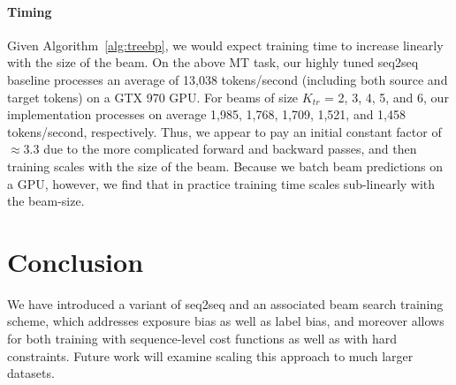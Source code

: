 %
\paragraph{Timing}
Given Algorithm~\ref{alg:treebp}, we would expect training time to increase linearly with the size of the beam. On the above MT task, our highly tuned seq2seq baseline processes an average of 13,038 tokens/second (including both source and target tokens) on a GTX 970 GPU. For beams of size $K_{tr}$ = 2, 3, 4, 5, and 6, our implementation processes on average 1,985, 1,768, 1,709, 1,521, and 1,458 tokens/second, respectively. Thus, we appear to pay an initial constant factor of $\approx 3.3$ due to the more complicated forward and backward passes, and then training scales with the size of the beam. Because we batch beam predictions on a GPU, however, we find that in practice training time scales sub-linearly with the beam-size. 

\section{Conclusion}
We have introduced a variant of seq2seq and an associated beam search training scheme, which addresses exposure bias as well as label bias, and moreover allows for both training with sequence-level cost functions as well as with hard constraints. Future work will examine scaling this approach to much larger datasets.




